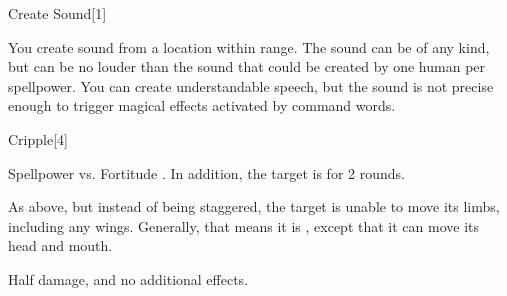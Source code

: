 \begin{spellsection}{Create Sound}[1]
    \begin{spellheader}
    \end{spellheader}
    \begin{spellcontent}
        \begin{spelltargetinginfo}
            \spellrng{\rngmed}
        \end{spelltargetinginfo}
        \begin{spelleffects}
            \spelleffect You create sound from a location within range. The sound can be of any kind, but can be no louder than the sound that could be created by one human per spellpower. You can create understandable speech, but the sound is not precise enough to trigger magical effects activated by command words.
            \spelldur \durshort \dismissable
        \end{spelleffects}
    \end{spellcontent}
    \begin{spellfooter}
        \miscastexplode
    \end{spellfooter}
\end{spellsection}

\begin{spellsection}{Cripple}[4]
    \begin{spellheader}
    \end{spellheader}
    \begin{spellcontent}
        \begin{spelltargetinginfo}
        \end{spelltargetinginfo}
        \begin{spelleffects}
            \begin{spellattack}{Spellpower vs. Fortitude}
                \spellsuccess {}. In addition, the target is \staggered for 2 rounds.

                \spellcritical As above, but instead of being staggered, the target is unable to move its limbs, including any wings. Generally, that means it is \paralyzed, except that it can move its head and mouth.

                \spellfailure Half damage, and no additional effects.
            \end{spellattack}
        \end{spelleffects}
    \end{spellcontent}
    \begin{spellfooter}
        \miscastrandom
    \end{spellfooter}
    \begin{spellaugments}
    \end{spellaugments}
\end{spellsection}

